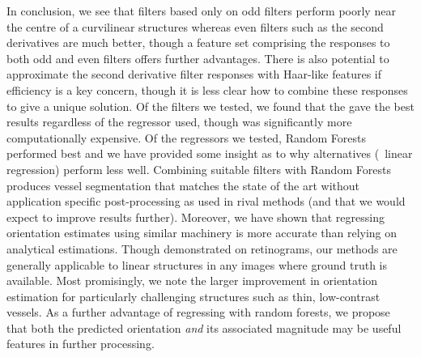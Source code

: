 In conclusion, we see that filters based only on odd filters perform poorly near the centre of a curvilinear structures whereas even filters such as the second derivatives are much better, though a feature set comprising the responses to both odd and even filters offers further advantages. 
There is also potential to approximate the second derivative filter responses with Haar-like features if efficiency is a key concern, though it is less clear how to combine these responses to give a unique solution. 
Of the filters we tested, we found that the \dtcwt{} gave the best results regardless of the regressor used, though was significantly more computationally expensive. Of the regressors we tested, Random Forests performed best and we have provided some insight as to why alternatives (\eg~linear regression) perform less well. 
Combining suitable filters with Random Forests produces vessel segmentation that matches the state of the art without application specific post-processing as used in rival methods (and that we would expect to improve results further). 
Moreover, we have shown that regressing orientation estimates using similar machinery is more accurate than relying on analytical estimations. 
Though demonstrated on retinograms, our methods are generally applicable to linear structures in any images where ground truth is available.
Most promisingly, we note the larger improvement in orientation estimation for particularly challenging structures such as thin, low-contrast vessels. As a further advantage of regressing with random forests, we propose that both the predicted orientation \emph{and} its associated magnitude may be useful features in further processing.
